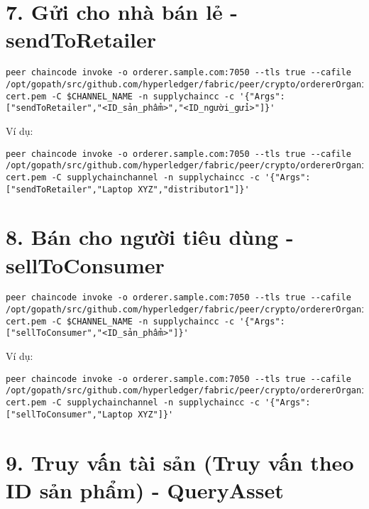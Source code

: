 \documentclass{article}
\begin{document}
\section{7. Gửi cho nhà bán lẻ - sendToRetailer}

\begin{lstlisting}[breaklines=true]
peer chaincode invoke -o orderer.sample.com:7050 --tls true --cafile /opt/gopath/src/github.com/hyperledger/fabric/peer/crypto/ordererOrganizations/sample.com/orderers/orderer.sample.com/msp/tlscacerts/tlsca.sample.com-cert.pem -C $CHANNEL_NAME -n supplychaincc -c '{"Args":["sendToRetailer","<ID_sản_phẩm>","<ID_người_gửi>"]}'
\end{lstlisting}

Ví dụ:

\begin{lstlisting}[breaklines=true]
peer chaincode invoke -o orderer.sample.com:7050 --tls true --cafile /opt/gopath/src/github.com/hyperledger/fabric/peer/crypto/ordererOrganizations/sample.com/orderers/orderer.sample.com/msp/tlscacerts/tlsca.sample.com-cert.pem -C supplychainchannel -n supplychaincc -c '{"Args":["sendToRetailer","Laptop XYZ","distributor1"]}'
\end{lstlisting}

\section{8. Bán cho người tiêu dùng - sellToConsumer}

\begin{lstlisting}[breaklines=true]
peer chaincode invoke -o orderer.sample.com:7050 --tls true --cafile /opt/gopath/src/github.com/hyperledger/fabric/peer/crypto/ordererOrganizations/sample.com/orderers/orderer.sample.com/msp/tlscacerts/tlsca.sample.com-cert.pem -C $CHANNEL_NAME -n supplychaincc -c '{"Args":["sellToConsumer","<ID_sản_phẩm>"]}'
\end{lstlisting}

Ví dụ:

\begin{lstlisting}[breaklines=true]
peer chaincode invoke -o orderer.sample.com:7050 --tls true --cafile /opt/gopath/src/github.com/hyperledger/fabric/peer/crypto/ordererOrganizations/sample.com/orderers/orderer.sample.com/msp/tlscacerts/tlsca.sample.com-cert.pem -C supplychainchannel -n supplychaincc -c '{"Args":["sellToConsumer","Laptop XYZ"]}'
\end{lstlisting}

\section{9. Truy vấn tài sản (Truy vấn theo ID sản phẩm) - QueryAsset}
\end{document}

